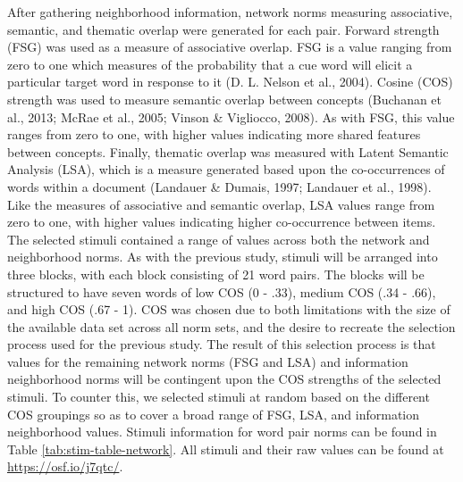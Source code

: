 \documentclass[english,man]{apa6}
\theoremstyle{definition}
\theoremstyle{definition}
\theoremstyle{definition}
\theoremstyle{remark}
\begin{document}
After gathering neighborhood information, network norms measuring
associative, semantic, and thematic overlap were generated for each
pair. Forward strength (FSG) was used as a measure of associative
overlap. FSG is a value ranging from zero to one which measures of the
probability that a cue word will elicit a particular target word in
response to it (D. L. Nelson et al., 2004). Cosine (COS) strength was
used to measure semantic overlap between concepts (Buchanan et al.,
2013; McRae et al., 2005; Vinson \& Vigliocco, 2008). As with FSG, this
value ranges from zero to one, with higher values indicating more shared
features between concepts. Finally, thematic overlap was measured with
Latent Semantic Analysis (LSA), which is a measure generated based upon
the co-occurrences of words within a document (Landauer \& Dumais, 1997;
Landauer et al., 1998). Like the measures of associative and semantic
overlap, LSA values range from zero to one, with higher values
indicating higher co-occurrence between items. The selected stimuli
contained a range of values across both the network and neighborhood
norms. As with the previous study, stimuli will be arranged into three
blocks, with each block consisting of 21 word pairs. The blocks will be
structured to have seven words of low COS (0 - .33), medium COS (.34 -
.66), and high COS (.67 - 1). COS was chosen due to both limitations
with the size of the available data set across all norm sets, and the
desire to recreate the selection process used for the previous study.
The result of this selection process is that values for the remaining
network norms (FSG and LSA) and information neighborhood norms will be
contingent upon the COS strengths of the selected stimuli. To counter
this, we selected stimuli at random based on the different COS groupings
so as to cover a broad range of FSG, LSA, and information neighborhood
values. Stimuli information for word pair norms can be found in Table
\ref{tab:stim-table-network}. All stimuli and their raw values can be
found at \url{https://osf.io/j7qtc/}.
\end{document}
